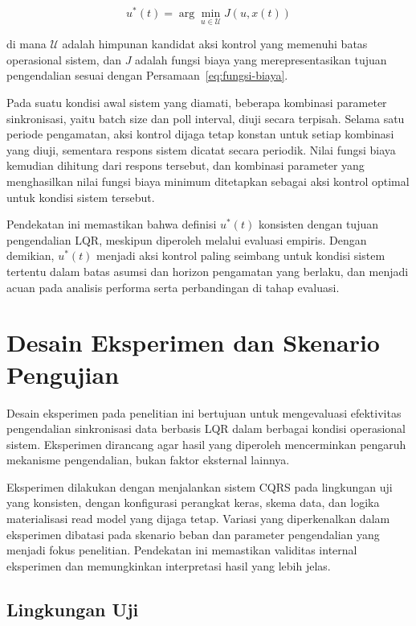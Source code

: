 \begin{equation}
u^*(t) = \arg\min_{u \in \mathcal{U}} J(u, x(t))
\label{eq:aksi-optimal}
\end{equation}

di mana $\mathcal{U}$ adalah himpunan kandidat aksi kontrol yang memenuhi batas operasional sistem, dan $J$ adalah fungsi biaya yang merepresentasikan tujuan pengendalian sesuai dengan Persamaan~\ref{eq:fungsi-biaya}.

Pada suatu kondisi awal sistem yang diamati, beberapa kombinasi parameter sinkronisasi, yaitu batch size dan poll interval, diuji secara terpisah.
Selama satu periode pengamatan, aksi kontrol dijaga tetap konstan untuk setiap kombinasi yang diuji, sementara respons sistem dicatat secara periodik.
Nilai fungsi biaya kemudian dihitung dari respons tersebut, dan kombinasi parameter yang menghasilkan nilai fungsi biaya minimum ditetapkan sebagai aksi kontrol optimal untuk kondisi sistem tersebut.

Pendekatan ini memastikan bahwa definisi $u^*(t)$ konsisten dengan tujuan pengendalian LQR, meskipun diperoleh melalui evaluasi empiris.
Dengan demikian, $u^*(t)$ menjadi aksi kontrol paling seimbang untuk kondisi sistem tertentu dalam batas asumsi dan horizon pengamatan yang berlaku, dan menjadi acuan pada analisis performa serta perbandingan di tahap evaluasi.

\section{Desain Eksperimen dan Skenario Pengujian}

Desain eksperimen pada penelitian ini bertujuan untuk mengevaluasi efektivitas pengendalian sinkronisasi data berbasis LQR dalam berbagai kondisi operasional sistem.
Eksperimen dirancang agar hasil yang diperoleh mencerminkan pengaruh mekanisme pengendalian, bukan faktor eksternal lainnya.

Eksperimen dilakukan dengan menjalankan sistem CQRS pada lingkungan uji yang konsisten, dengan konfigurasi perangkat keras, skema data, dan logika materialisasi read model yang dijaga tetap.
Variasi yang diperkenalkan dalam eksperimen dibatasi pada skenario beban dan parameter pengendalian yang menjadi fokus penelitian.
Pendekatan ini memastikan validitas internal eksperimen dan memungkinkan interpretasi hasil yang lebih jelas.

\subsection{Lingkungan Uji}

